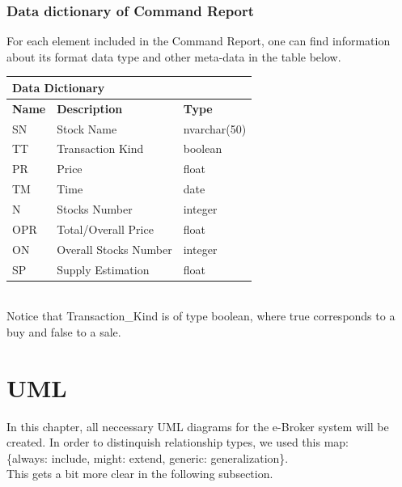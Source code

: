 \documentclass{article}
\begin{document}
\subsubsection{Data dictionary of Command Report}
For each element included in the Command Report, one can find information about
its format data type and other meta-data in the table below. 
\begin{table}[htbp]
\begin{tabular}{|l|l|l|}
\hline
\multicolumn{3}{|l|}{\Large \textbf{Data Dictionary}}      \\ \hline
\textbf{Name}  & \textbf{Description}           & \textbf{Type}         \\ \hline
SN  & Stock Name            & nvarchar(50) \\ \hline
TT  & Transaction Kind      & boolean      \\ \hline
PR  & Price                 & float        \\ \hline
TM  & Time                  & date         \\ \hline
N   & Stocks Number         & integer      \\ \hline
OPR & Total/Overall Price   & float        \\ \hline
ON  & Overall Stocks Number & integer      \\ \hline
SP  & Supply Estimation     & float        \\ \hline
\end{tabular}
\end{table}\\
Notice that Transaction\_Kind is of type boolean, where true corresponds to a buy and false to a sale. 


\newpage
\section{UML}
In this chapter, all neccessary UML diagrams for the e-Broker system will be created. In order to distinquish relationship types, we used this map: \\\hspace*{16mm}\{always: include, might: extend, generic: generalization\}. \\
This gets a bit more clear in the following subsection. 
\end{document}
